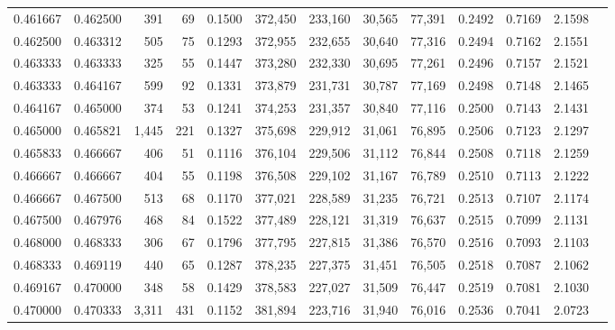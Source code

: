 \begin{tabular}{rrrrrrrrrrrrr}
0.461667 & 0.462500 &   391 &  69 &                                     0.1500 & 372,450 & 233,160 &  30,565 &  77,391 & 0.2492 & 0.7169 & 2.1598 \\
0.462500 & 0.463312 &   505 &  75 &                                     0.1293 & 372,955 & 232,655 &  30,640 &  77,316 & 0.2494 & 0.7162 & 2.1551 \\
0.463333 & 0.463333 &   325 &  55 &                                     0.1447 & 373,280 & 232,330 &  30,695 &  77,261 & 0.2496 & 0.7157 & 2.1521 \\
0.463333 & 0.464167 &   599 &  92 &                                     0.1331 & 373,879 & 231,731 &  30,787 &  77,169 & 0.2498 & 0.7148 & 2.1465 \\
0.464167 & 0.465000 &   374 &  53 &                                     0.1241 & 374,253 & 231,357 &  30,840 &  77,116 & 0.2500 & 0.7143 & 2.1431 \\
0.465000 & 0.465821 & 1,445 & 221 &                                     0.1327 & 375,698 & 229,912 &  31,061 &  76,895 & 0.2506 & 0.7123 & 2.1297 \\
0.465833 & 0.466667 &   406 &  51 &                                     0.1116 & 376,104 & 229,506 &  31,112 &  76,844 & 0.2508 & 0.7118 & 2.1259 \\
0.466667 & 0.466667 &   404 &  55 &                                     0.1198 & 376,508 & 229,102 &  31,167 &  76,789 & 0.2510 & 0.7113 & 2.1222 \\
0.466667 & 0.467500 &   513 &  68 &                                     0.1170 & 377,021 & 228,589 &  31,235 &  76,721 & 0.2513 & 0.7107 & 2.1174 \\
0.467500 & 0.467976 &   468 &  84 &                                     0.1522 & 377,489 & 228,121 &  31,319 &  76,637 & 0.2515 & 0.7099 & 2.1131 \\
0.468000 & 0.468333 &   306 &  67 &                                     0.1796 & 377,795 & 227,815 &  31,386 &  76,570 & 0.2516 & 0.7093 & 2.1103 \\
0.468333 & 0.469119 &   440 &  65 &                                     0.1287 & 378,235 & 227,375 &  31,451 &  76,505 & 0.2518 & 0.7087 & 2.1062 \\
0.469167 & 0.470000 &   348 &  58 &                                     0.1429 & 378,583 & 227,027 &  31,509 &  76,447 & 0.2519 & 0.7081 & 2.1030 \\
0.470000 & 0.470333 & 3,311 & 431 &                                     0.1152 & 381,894 & 223,716 &  31,940 &  76,016 & 0.2536 & 0.7041 & 2.0723 \\

\end{tabular}
